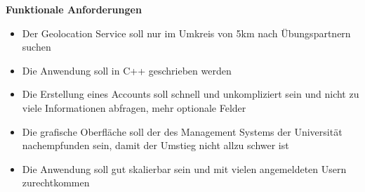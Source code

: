 \documentclass[a4paper,graphics,11pt]{article}
\begin{document}
\noindent \textbf{Funktionale Anforderungen}\\
\begin{itemize}
\item Der Geolocation Service soll nur im Umkreis von 5km nach Übungspartnern suchen\\
\item Die Anwendung soll in C++ geschrieben werden\\
\item Die Erstellung eines Accounts soll schnell und unkompliziert sein und nicht zu viele Informationen abfragen, mehr optionale Felder\\
\item Die grafische Oberfläche soll der des Management Systems der Universität nachempfunden sein, damit der Umstieg nicht allzu schwer ist\\
\item Die Anwendung soll gut skalierbar sein und mit vielen angemeldeten Usern zurechtkommen\\
\end{itemize}
\end{document}

